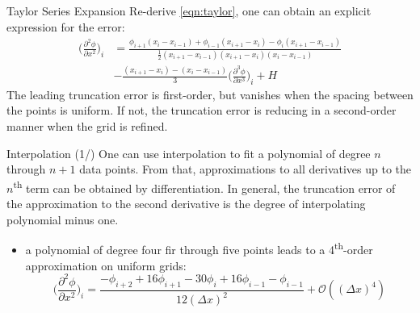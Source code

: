 \documentclass[10pt,aspectratio=169]{beamer}
\begin{document}
\begin{frame}{Taylor Series Expansion}
Re-derive \autoref{eqn:taylor}, one can obtain an explicit expression for the error:
\begin{align*}
    \bigg( \frac{\partial^{2}\phi}{\partial x^{2}} \bigg)_{i} &=
    \frac{\phi_{i+1}(x_{i}-x_{i-1}) + \phi_{i-1}(x_{i+1}-x_{i})-\phi_{i}(x_{i+1}-x_{i-1})}{\frac{1}{2}(x_{i+1}-x_{i-1}) (x_{i+1}-x_{i}) (x_{i}-x_{i-1})}\\
    & - \frac{(x_{i+1}-x_{i}) - (x_{i}-x_{i-1})}{3} \bigg(\frac{\partial^{3}\phi}{\partial x^{3}}\bigg)_{i}+H
\end{align*}
The leading truncation error is first-order, but vanishes when the spacing between the points is uniform. If not, the truncation error is reducing in a second-order manner when the grid is refined.
\end{frame}
\begin{frame}{Interpolation (1/)}
One can use interpolation to fit a polynomial of degree $n$ through $n+1$ data points. From that, approximations to all derivatives up to the $n$\textsuperscript{th} term can be obtained by differentiation. \newline \newline
In general, the truncation error of the approximation to the second derivative is the degree of interpolating polynomial minus one.
\begin{itemize}
    \item a polynomial of degree four fir through five points leads to a 4\textsuperscript{th}-order approximation on uniform grids:
    \[
    \bigg( \frac{\partial^{2}\phi}{\partial x^{2}} \bigg)_{i} = \frac{-\phi_{i+2}+16\phi_{i+1}-30\phi_{i}+16\phi_{i-1}-\phi_{i-1}}{12(\Delta x)^{2}} + \mathcal{O}((\Delta x)^{4})
    \]
\end{itemize}
\end{frame}
\end{document}

